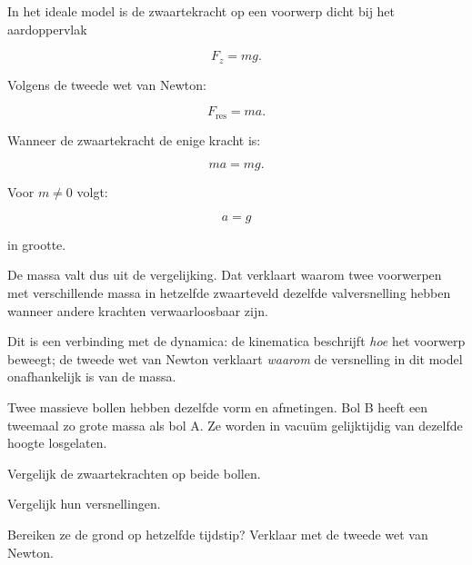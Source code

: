 \documentclass{ximera}
\begin{document}
In het ideale model is de zwaartekracht op een voorwerp dicht bij het
aardoppervlak

\[
F_z=mg.
\]

Volgens de tweede wet van Newton:

\[
F_{\mathrm{res}}=ma.
\]

Wanneer de zwaartekracht de enige kracht is:

\[
ma=mg.
\]

Voor $m\neq0$ volgt:

\[
\boxed{a=g}
\]

in grootte.

De massa valt dus uit de vergelijking. Dat verklaart waarom twee
voorwerpen met verschillende massa in hetzelfde zwaarteveld dezelfde
valversnelling hebben wanneer andere krachten verwaarloosbaar zijn.

\begin{opmerking}

Dit is een verbinding met de dynamica: de kinematica beschrijft
\emph{hoe} het voorwerp beweegt; de tweede wet van Newton verklaart
\emph{waarom} de versnelling in dit model onafhankelijk is van de
massa.

\end{opmerking}


\begin{oefening}{\oefU\ESS}

Twee massieve bollen hebben dezelfde vorm en afmetingen. Bol B heeft
een tweemaal zo grote massa als bol A. Ze worden in vacuüm gelijktijdig
van dezelfde hoogte losgelaten.

\begin{question}
Vergelijk de zwaartekrachten op beide bollen.
\end{question}

\begin{question}
Vergelijk hun versnellingen.
\end{question}

\begin{question}
Bereiken ze de grond op hetzelfde tijdstip? Verklaar met de tweede
wet van Newton.
\end{question}

\end{oefening}



\end{document}
